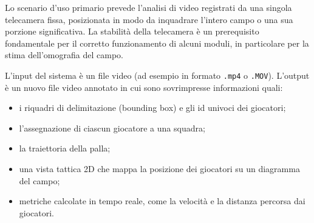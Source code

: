 \documentclass[12pt,a4paper,openright,twoside]{book}
\begin{document}
Lo scenario d'uso primario prevede l'analisi di video registrati da una singola telecamera fissa, posizionata in modo 
da inquadrare l'intero campo o una sua porzione significativa. La stabilità della telecamera è un prerequisito fondamentale 
per il corretto funzionamento di alcuni moduli, in particolare per la stima dell'omografia del campo.

L'input del sistema è un file video (ad esempio in formato \texttt{.mp4} o \texttt{.MOV}).
L'output è un nuovo file video annotato in cui sono sovrimpresse informazioni quali:
\begin{itemize}
  \item i riquadri di delimitazione (bounding box) e gli \ac{id} univoci dei giocatori;
  \item l'assegnazione di ciascun giocatore a una squadra;
  \item la traiettoria della palla;
  \item una vista tattica 2D che mappa la posizione dei giocatori su un diagramma del campo;
  \item metriche calcolate in tempo reale, come la velocità e la distanza percorsa dai giocatori.
\end{itemize}
\end{document}

